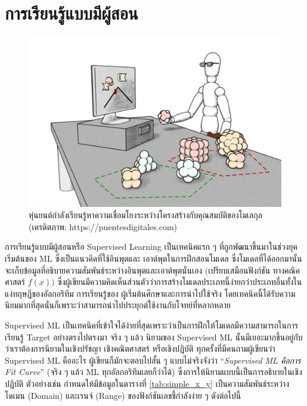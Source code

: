 

\chapter{การเรียนรู้แบบมีผู้สอน}
\label{ch:sup_ml}

\begin{figure}[H]
    \centering
    \includegraphics[width=0.9\linewidth]{fig/supervised_ml.png}
    \caption{หุ่นยนต์กำลังเรียนรู้หาความเชื่อมโยงระหว่างโครงสร้างกับคุณสมบัติของโมเลกุล (เครดิตภาพ: https://puentesdigitales.com)}
    \label{fig:supervised_ml}
\end{figure}

การเรียนรู้แบบมีผู้สอนหรือ Supervised Learning เป็นเทคนิคแรก ๆ ที่ถูกพัฒนาขึ้นมาในช่วงยุคเริ่มต้นของ ML ซึ่งเป็นแนวคิดที่ใช้อินพุตและ%
เอาต์พุตในการฝึกสอนโมเดล ซึ่งโมเดลที่ได้ออกมานั้นจะเก็บข้อมูลที่อธิบายความสัมพันธ์ระหว่างอินพุตและเอาต์พุตนั่นเอง $($เปรียบเสมือนฟังก์ชัน%
ทางคณิคศาสตร์ $f(x))$ ซึ่งผู้เขียนมีความคิดเห็นส่วนตัวว่าการสร้างโมเดลประเภทนี้ง่ายกว่าประเภทอื่นทั้งในแง่ทฤษฎีของอัลกอริทึม การเรียนรู้ของ%
ผู้เริ่มต้นศึกษาและการนำไปใช้จริง โดยเทคนิคนี้ได้รับความนิยมมากที่สุดนั่นก็เพราะว่าสามารถนำไปประยุกต์ใช้งานกับโจทย์ที่หลากหลาย

Supervised ML เป็นเทคนิคที่เข้าใจได้ง่ายที่สุดเพราะว่าเป็นการฝึกให้โมเดลมีความสามารถในการเรียนรู้ Target อย่างตรงไปตรงมา จริง ๆ แล้ว%
นิยามของ Supervised ML นั้นมีเยอะมากขึ้นอยู่กับว่าเราต้องการนิยามในเชิงปรัชญา เชิงคณิตศาสตร์ หรือเชิงปฏิบัติ ทุกครั้งที่มีคนถามผู้เขียนว่า
Supervised ML คืออะไร ผู้เขียนก็มักจะตอบไปสั้น ๆ แบบไม่จริงจังว่า \enquote{\textit{Supervised ML คือการ Fit Curve}} (จริง ๆ
แล้ว ML ทุกอัลกอริทึมเลยก็ว่าได้) ซึ่งการให้นิยามแบบนี้เป็นการอธิบายในเชิงปฏิบัติ ตัวอย่างเช่น กำหนดให้มีข้อมูลในตารางที่
\ref{tab:simple_x_y} เป็นความสัมพันธ์ระหว่างโดเมน (Domain) และเรนจ์ (Range) ของฟังก์ชันเลขชี้กำลังง่าย ๆ ดังต่อไปนี้

